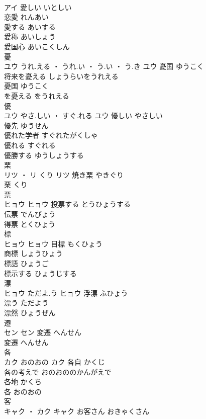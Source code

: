 \documentclass[8pt]{extreport}
\begin{document}
\begin{CJK}{UTF8}{min}
\\	アイ	愛しい	いとしい	
\\	恋愛	れんあい	
\\	愛する	あいする	
\\	愛称	あいしょう	
\\	愛国心	あいこくしん	
\\	憂	
\\	ユウ	うれ.える ・ うれ.い ・ う.い ・ う.き	ユウ	憂国	ゆうこく	
\\	将来を憂える	しょうらいをうれえる	
\\	憂国	ゆうこく	
\\	を憂える	をうれえる	
\\	優	
\\	ユウ	やさ.しい ・ すぐ.れる	ユウ	優しい	やさしい	
\\	優先	ゆうせん	
\\	優れた学者	すぐれたがくしゃ	
\\	優れる	すぐれる	
\\	優勝する	ゆうしょうする	
\\	栗	
\\	リツ ・ リ	くり	リツ	焼き栗	やきぐり	
\\	栗	くり	
\\	票	
\\	ヒョウ		ヒョウ	投票する	とうひょうする	
\\	伝票	でんぴょう	
\\	得票	とくひょう	
\\	標	
\\	ヒョウ		ヒョウ													目標	もくひょう	
\\	商標	しょうひょう	
\\	標語	ひょうご	
\\	標示する	ひょうじする	
\\	漂	
\\	ヒョウ	ただよ.う	ヒョウ	浮漂	ふひょう	
\\	漂う	ただよう	
\\	漂然	ひょうぜん	
\\	遷	
\\	セン		セン	変遷	へんせん	
\\	変遷	へんせん	
\\	各	
\\	カク	おのおの	カク	各自	かくじ	
\\	各の考えで	おのおののかんがえで	
\\	各地	かくち	
\\	各	おのおの	
\\	客	
\\	キャク ・ カク		キャク	お客さん	おきゃくさん	

\end{CJK}
\end{document}
